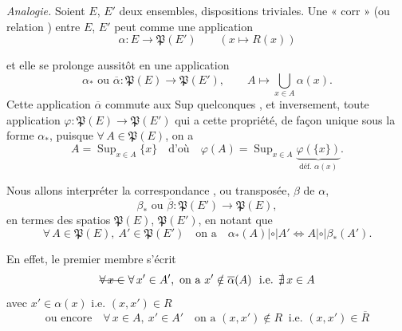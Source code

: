 \documentclass[11pt,a4paper]{article}
\begin{document}
 \emph{Analogie.} Soient $E$, $E'$ deux ensembles, \struck{\ill{}}  dispositions triviales. Une « corr » (ou relation ) entre $E$, $E'$ peut  comme une application
\[
  \alpha : E \longrightarrow \mathfrak{P}(E') \qquad (x \longmapsto R(x))
\]


et elle se prolonge aussitôt en une application
\[
  \alpha_{*} \text{ ou } \overline{\alpha} : \mathfrak{P}(E) \longrightarrow \mathfrak{P}(E') , \qquad A \longmapsto \bigcup_{x \in A} \alpha(x) .
\]
Cette application $\overline{\alpha}$ commute aux Sup quelconques , et inversement, \struck{\ill{}} toute application $\varphi : \mathfrak{P}(E) \to \mathfrak{P}(E')$ qui a cette propriété,  de façon unique sous la forme $\alpha_{*}$, puisque $\forall\, A \in \mathfrak{P}(E)$, on a
\[
  A = \operatorname{Sup}_{x \in A} \{x\} \quad \text{d'où} \quad \varphi(A) = \operatorname{Sup}_{x \in A} \underbrace{\varphi(\{x\})}_{\text{déf. } \alpha(x)} .
\]


Nous allons interpréter  la correspondance , ou transposée, $\beta$ de $\alpha$, 
\[
  \beta_{*} \text{ ou } \overline{\beta} : \mathfrak{P}(E') \longrightarrow \mathfrak{P}(E) ,
\]
en \struck{\ill{}} termes des spatios $\mathfrak{P}(E)$, $\mathfrak{P}(E')$, en notant que
\[
  \forall\, A \in \mathfrak{P}(E),\ A' \in \mathfrak{P}(E') \quad \text{on a} \quad
  \alpha_{*}(A) \mathrel{|\circ|} A' \iff A \mathrel{|\circ|} \beta_{*}(A') .
\]

En effet, le premier membre s'écrit
\[
  \text{\struck{$\forall\, x \in$}}\ \forall\, x' \in A', \ \text{on a } x' \notin \overline{\alpha}(A) \ \text{ i.e. } \nexists\, x \in A
\]
avec $x' \in \alpha(x)$ i.e. $(x, x') \in R$
\[
  \text{ou encore} \quad \forall\, x \in A,\ x' \in A' \quad \text{on a } (x, x') \notin R \ \text{ i.e. } (x, x') \in \overline{R}
\]
\end{document}
